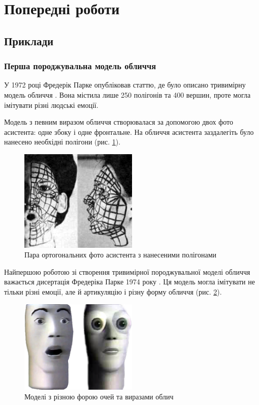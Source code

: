 \section{Попередні роботи}

\subsection{Приклади}

\subsubsection{Перша породжувальна модель обличчя}

У 1972 році Фредерік Парке опубліковав статтю,
де було описано тривимірну модель обличчя \cite{Parke:1972}.
Вона містила лише 250 полігонів та 400 вершин,
проте могла імітувати різні людські емоції.

Модель з певним виразом обличчя створювалася за допомогою двох фото асистента:
одне збоку і одне фронтальне.
На обличчя асистента заздалегіть було нанесено необхідні полігони
(рис. \ref{fig:parke:face-paint}).
\begin{figure}[h]
  \centering
    \includegraphics[width=0.5\textwidth]{images/Parke-face-paint}
  \caption{Пара ортогональних фото асистента з нанесеними полігонами}
  \label{fig:parke:face-paint}
\end{figure}

Найпершою роботою зі створення
тривимірної породжувальної моделі обличчя важається
дисертація Фредеріка Парке 1974 року \cite{Parke:1974}.
Ця модель могла імітувати не тільки різні емоції,
але й артикуляцію і різну форму обличчя
(рис. \ref{fig:parke:face-models}).
\begin{figure}[h]
  \centering
    \includegraphics[width=0.5\textwidth]{images/Parke-faces}
  \caption{Моделі з різною форою очей та виразами облич}
  \label{fig:parke:face-models}
\end{figure}

